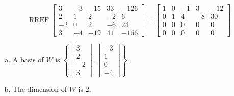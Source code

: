 \begin{exerciseAnswer} 


\[\operatorname{RREF} \left[\begin{array}{ccccc}
3 & -3 & -15 & 33 & -126 \\
2 & 1 & 2 & -2 & 6 \\
-2 & 0 & 2 & -6 & 24 \\
3 & -4 & -19 & 41 & -156
\end{array}\right] = \left[\begin{array}{ccccc}
1 & 0 & -1 & 3 & -12 \\
0 & 1 & 4 & -8 & 30 \\
0 & 0 & 0 & 0 & 0 \\
0 & 0 & 0 & 0 & 0
\end{array}\right] \]


\begin{enumerate}[(a)]
\item A basis of \(W\) is \( \left\{ \left[\begin{array}{c}
3 \\
2 \\
-2 \\
3
\end{array}\right] , \left[\begin{array}{c}
-3 \\
1 \\
0 \\
-4
\end{array}\right] \right\} \).
\item The dimension of \(W\) is \( 2 \).
\end{enumerate}
    
\end{exerciseAnswer}
    
